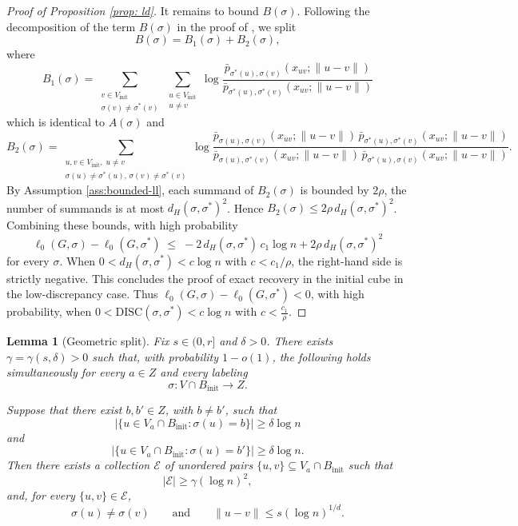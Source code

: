 \documentclass[11pt, a4paper]{amsart}
\newtheorem{lemma}[theorem]{Lemma}
\newcommand{\1}{\mathbf{1}}
\theoremstyle{definition}
\theoremstyle{remark}
\theoremstyle{definition}
\begin{document}
\begin{proof}[Proof of Proposition \ref{prop: ld}]
It remains to bound $B(\sigma)$. Following the decomposition of the term $B(\sigma)$ in the proof of
\cite{gaudio2026jan}, we split
\begin{equation}
B(\sigma) = B_1(\sigma) + B_2(\sigma),
\end{equation}
where
\begin{equation}
B_1(\sigma) = \sum_{\substack{v \in {V_{\mathrm{init}}} \\ \sigma(v) \neq \sigma^*(v)}} 
\sum_{\substack{u \in {V_{\mathrm{init}}} \\ u \neq v}} 
\log \frac{\bar{p}_{\sigma^*(u), \sigma(v)}(x_{uv}; \|u - v\|)}
{\bar{p}_{\sigma^*(u), \sigma^*(v)}(x_{uv}; \|u - v\|)}
\end{equation}
which is identical to $A(\sigma)$ and
\begin{equation}
B_2(\sigma) = \sum_{\substack{u, v \in {V_{\mathrm{init}}}, \; u \neq v \\ 
\sigma(u) \neq \sigma^*(u), \, \sigma(v) \neq \sigma^*(v)}} 
\log \frac{\bar{p}_{\sigma(u), \sigma(v)}(x_{uv}; \|u - v\|) \, 
\bar{p}_{\sigma^*(u), \sigma^*(v)}(x_{uv}; \|u - v\|)}
{\bar{p}_{\sigma(u), \sigma^*(v)}(x_{uv}; \|u - v\|) \, 
\bar{p}_{\sigma^*(u), \sigma(v)}(x_{uv}; \|u - v\|)}.
\end{equation}
By Assumption \ref{ass:bounded-ll}, each summand of $B_2(\sigma)$ is bounded by 
$2\rho$, the number of summands is at most $d_H(\sigma, \sigma^*)^2$. Hence 
$B_2(\sigma) \le 2\rho\, d_H(\sigma, \sigma^*)^2$.
Combining these bounds, with high probability
\begin{equation}
\ell_0(G, \sigma) - \ell_0(G, \sigma^*) 
\;\leq\; -2\, d_H(\sigma, \sigma^*)\, c_1 \log n + 2\rho\, d_H(\sigma, \sigma^*)^2
\end{equation}
for every $\sigma$. When $0 < d_H(\sigma, \sigma^*) < c \log n$ with $c <c_1/\rho$, 
the right-hand side is strictly negative. This concludes the proof of exact 
recovery in the initial cube in the low-discrepancy case.
Thus  $\ell_0(G, \sigma) - \ell_0(G, \sigma^*) < 0$, with high probability, when  $0 <\text{DISC}(\sigma, \sigma^*) <c \log n $ with $c <\frac{c_1}{\rho}$. 
\end{proof}



\begin{lemma}[Geometric split]
\label{lem:geometric-split}
Fix $s\in(0,r]$ and $\delta>0$. There exists
$\gamma=\gamma(s,\delta)>0$ such that, with probability $1-o(1)$,
the following holds simultaneously for every $a\in Z$ and every
labeling
\[
\sigma:V\cap B_{\mathrm{init}}\to Z.
\]

Suppose that there exist $b,b'\in Z$, with $b\neq b'$, such that
\[
\left|
\{u\in V_a\cap B_{\mathrm{init}}:\sigma(u)=b\}
\right|
\geq\delta\log n
\]
and
\[
\left|
\{u\in V_a\cap B_{\mathrm{init}}:\sigma(u)=b'\}
\right|
\geq\delta\log n.
\]
Then there exists a collection $\mathcal E$ of unordered pairs
$\{u,v\}\subseteq V_a\cap B_{\mathrm{init}}$ such that
\[
|\mathcal E|
\geq
\gamma(\log n)^2,
\]
and, for every $\{u,v\}\in\mathcal E$,
\[
\sigma(u)\neq\sigma(v)
\qquad\text{and}\qquad
\|u-v\|
\leq
s(\log n)^{1/d}.
\]
\end{lemma}
\end{document}

